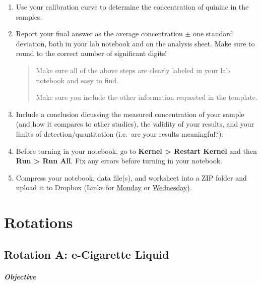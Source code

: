 \documentclass[]{tufte-book}
\begin{document}
\begin{enumerate}
  \begin{marginfigure}
   The percent difference between the measured and known concentration of
   your QC should be \textless5\%
   \end{marginfigure}
\item
  Use your calibration curve to determine the concentration of quinine in the samples.\\
\item
  Report your final answer as the average concentration \(\pm\) one standard deviation, both in your lab notebook and on the analysis sheet. Make sure to round to the correct number of significant digits!

  \begin{quote}
  Make sure all of the above steps are clearly labeled in your lab notebook and easy to find.

  Make sure you include the other information requested in the template.
  \end{quote}
\item
  Include a conclusion dicussing the measured concentration of your sample (and how it compares to other studies), the validity of your results, and your limits of detection/quantitation (i.e.~are your results meaningful?).
\item
  Before turning in your notebook, go to \textbf{Kernel \textgreater{} Restart Kernel} and then \textbf{Run \textgreater{} Run All}. Fix any errors before turning in your notebook.
\item
  Compress your notebook, data file(s), and worksheet into a ZIP folder and upload it to Dropbox (Links for \href{https://alphonse.github.io/chem370/assignments/submissions.html}{Monday} or \href{https://alphonse.github.io/chem370/assignments/submissions-wednesday.html}{Wednesday}).
\end{enumerate}

\hypertarget{part-rotations}{%
\part{Rotations}\label{part-rotations}}

\hypertarget{rotation-a-e-cigarette-liquid}{%
\chapter{Rotation A: e-Cigarette Liquid}\label{rotation-a-e-cigarette-liquid}}

\hypertarget{objective}{%
\paragraph{\texorpdfstring{\textbf{Objective}}{Objective}}\label{objective}}
\end{document}
